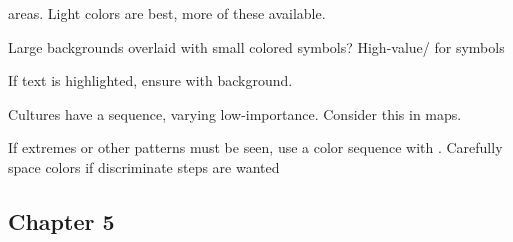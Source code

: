 \begin{compactenum}
    \item {} areas. Light colors are best, more
        of these available.

    \item Large backgrounds overlaid with small colored symbols?
        High-value/ for
        symbols

    \item If text is highlighted, ensure  with background.

    \item Cultures have a  sequence, varying
        low-importance. Consider this in maps.

    \item If extremes or other patterns must be seen, use a
        color sequence with . Carefully
        space colors if discriminate steps are wanted

\end{compactenum}

\subsection{Chapter 5}


